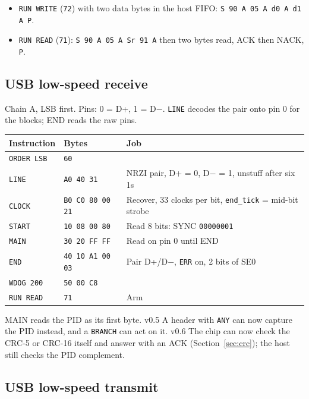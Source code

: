 \documentclass[11pt,a4paper]{article}
\newcommand{\vfive}{\textcolor{fivec}{\textsf{\small v0.5}}}
\newcommand{\vsix}{\textcolor{sixc}{\textsf{\small v0.6}}}
\newcommand{\sig}[1]{\texttt{#1}}
\begin{document}
\begin{itemize}
\item \sig{RUN WRITE} (\texttt{72}) with two data bytes in the host FIFO: \texttt{S 90 A 05 A d0 A d1 A P}.
\item \sig{RUN READ} (\texttt{71}): \texttt{S 90 A 05 A Sr 91 A} then two bytes read, ACK then NACK, \texttt{P}.
\end{itemize}

\subsection{USB low-speed receive}

Chain A, LSB first. Pins: 0 = D+, 1 = D$-$. \sig{LINE} decodes the pair onto pin 0 for the blocks; END reads the raw pins.

\begin{center}
\begin{tabular}{@{}lll@{}}
\toprule
Instruction & Bytes & Job \\
\midrule
\sig{ORDER LSB} & \texttt{60} & \\
\sig{LINE} & \texttt{A0 40 31} & NRZI pair, D+ = 0, D$-$ = 1, unstuff after six 1s \\
\sig{CLOCK} & \texttt{B0 C0 80 00 21} & Recover, 33 clocks per bit, \sig{end\_tick} = mid-bit strobe \\
\sig{START} & \texttt{10 08 00 80} & Read 8 bits: SYNC \texttt{00000001} \\
\sig{MAIN} & \texttt{30 20 FF FF} & Read on pin 0 until END \\
\sig{END} & \texttt{40 10 A1 00 03} & Pair D+/D$-$, \sig{ERR} on, 2 bits of SE0 \\
\sig{WDOG 200} & \texttt{50 00 C8} & \\
\sig{RUN READ} & \texttt{71} & Arm \\
\bottomrule
\end{tabular}
\end{center}

MAIN reads the PID as its first byte. \vfive{} A header with \sig{ANY} can now capture the PID instead, and a \sig{BRANCH} can act on it. \vsix{} The chip can now check the CRC-5 or CRC-16 itself and answer with an ACK (Section~\ref{sec:crc}); the host still checks the PID complement.

\subsection{USB low-speed transmit}
\end{document}
